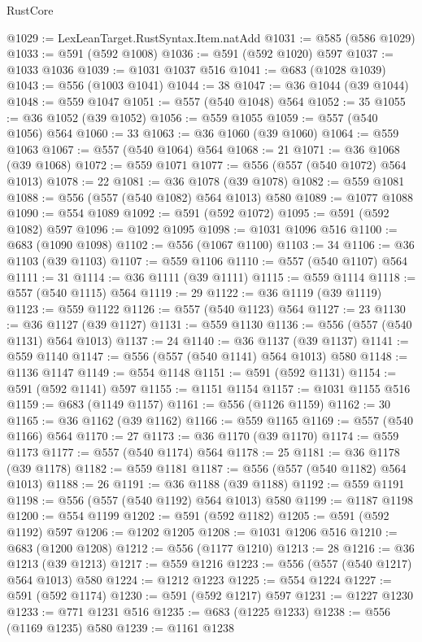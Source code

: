 \begin{lexlean}{RustCore}
\begin{coremodule}
@1029 := LexLeanTarget.RustSyntax.Item.natAdd
@1031 := @585 (@586 @1029)
@1033 := @591 (@592 @1008)
@1036 := @591 (@592 @1020) @597
@1037 := @1033 @1036
@1039 := @1031 @1037 @516
@1041 := @683 (@1028 @1039)
@1043 := @556 (@1003 @1041)
@1044 := 38
@1047 := @36 @1044 (@39 @1044)
@1048 := @559 @1047
@1051 := @557 (@540 @1048) @564
@1052 := 35
@1055 := @36 @1052 (@39 @1052)
@1056 := @559 @1055
@1059 := @557 (@540 @1056) @564
@1060 := 33
@1063 := @36 @1060 (@39 @1060)
@1064 := @559 @1063
@1067 := @557 (@540 @1064) @564
@1068 := 21
@1071 := @36 @1068 (@39 @1068)
@1072 := @559 @1071
@1077 := @556 (@557 (@540 @1072) @564 @1013)
@1078 := 22
@1081 := @36 @1078 (@39 @1078)
@1082 := @559 @1081
@1088 := @556 (@557 (@540 @1082) @564 @1013) @580
@1089 := @1077 @1088
@1090 := @554 @1089
@1092 := @591 (@592 @1072)
@1095 := @591 (@592 @1082) @597
@1096 := @1092 @1095
@1098 := @1031 @1096 @516
@1100 := @683 (@1090 @1098)
@1102 := @556 (@1067 @1100)
@1103 := 34
@1106 := @36 @1103 (@39 @1103)
@1107 := @559 @1106
@1110 := @557 (@540 @1107) @564
@1111 := 31
@1114 := @36 @1111 (@39 @1111)
@1115 := @559 @1114
@1118 := @557 (@540 @1115) @564
@1119 := 29
@1122 := @36 @1119 (@39 @1119)
@1123 := @559 @1122
@1126 := @557 (@540 @1123) @564
@1127 := 23
@1130 := @36 @1127 (@39 @1127)
@1131 := @559 @1130
@1136 := @556 (@557 (@540 @1131) @564 @1013)
@1137 := 24
@1140 := @36 @1137 (@39 @1137)
@1141 := @559 @1140
@1147 := @556 (@557 (@540 @1141) @564 @1013) @580
@1148 := @1136 @1147
@1149 := @554 @1148
@1151 := @591 (@592 @1131)
@1154 := @591 (@592 @1141) @597
@1155 := @1151 @1154
@1157 := @1031 @1155 @516
@1159 := @683 (@1149 @1157)
@1161 := @556 (@1126 @1159)
@1162 := 30
@1165 := @36 @1162 (@39 @1162)
@1166 := @559 @1165
@1169 := @557 (@540 @1166) @564
@1170 := 27
@1173 := @36 @1170 (@39 @1170)
@1174 := @559 @1173
@1177 := @557 (@540 @1174) @564
@1178 := 25
@1181 := @36 @1178 (@39 @1178)
@1182 := @559 @1181
@1187 := @556 (@557 (@540 @1182) @564 @1013)
@1188 := 26
@1191 := @36 @1188 (@39 @1188)
@1192 := @559 @1191
@1198 := @556 (@557 (@540 @1192) @564 @1013) @580
@1199 := @1187 @1198
@1200 := @554 @1199
@1202 := @591 (@592 @1182)
@1205 := @591 (@592 @1192) @597
@1206 := @1202 @1205
@1208 := @1031 @1206 @516
@1210 := @683 (@1200 @1208)
@1212 := @556 (@1177 @1210)
@1213 := 28
@1216 := @36 @1213 (@39 @1213)
@1217 := @559 @1216
@1223 := @556 (@557 (@540 @1217) @564 @1013) @580
@1224 := @1212 @1223
@1225 := @554 @1224
@1227 := @591 (@592 @1174)
@1230 := @591 (@592 @1217) @597
@1231 := @1227 @1230
@1233 := @771 @1231 @516
@1235 := @683 (@1225 @1233)
@1238 := @556 (@1169 @1235) @580
@1239 := @1161 @1238

\end{coremodule}
\end{lexlean}
